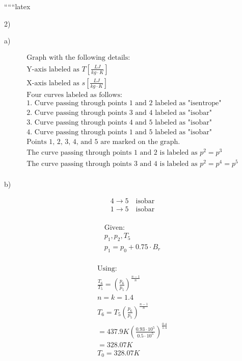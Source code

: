 
``````latex


2)

a)

\[
\begin{array}{c}
\text{Graph with the following details:} \\
\text{Y-axis labeled as } T \left[ \frac{LJ}{kg \cdot K} \right] \\
\text{X-axis labeled as } s \left[ \frac{LJ}{kg \cdot K} \right] \\
\text{Four curves labeled as follows:} \\
\text{1. Curve passing through points 1 and 2 labeled as "isentrope"} \\
\text{2. Curve passing through points 3 and 4 labeled as "isobar"} \\
\text{3. Curve passing through points 4 and 5 labeled as "isobar"} \\
\text{4. Curve passing through points 1 and 5 labeled as "isobar"} \\
\text{Points 1, 2, 3, 4, and 5 are marked on the graph.} \\
\text{The curve passing through points 1 and 2 is labeled as } p^2 = p^3 \\
\text{The curve passing through points 3 and 4 is labeled as } p^2 = p^4 = p^5 \\
\end{array}
\]

b)

\[
\begin{array}{l}
4 \rightarrow 5 \quad \text{isobar} \\
1 \rightarrow 5 \quad \text{isobar} \\
\end{array}
\]

\[
\begin{array}{l}
\text{Given:} \\
p_1, p_2, T_5 \\
p_1 = p_0 + 0.75 \cdot B_r \\
\end{array}
\]

\[
\begin{array}{l}
\text{Using:} \\
\frac{T_6}{T_5} = \left( \frac{p_6}{p_5} \right)^{\frac{n-1}{n}} \\
n = k = 1.4 \\
T_6 = T_5 \left( \frac{p_6}{p_5} \right)^{\frac{n-1}{n}} \\
= 437.9 K \left( \frac{0.93 \cdot 10^5}{0.5 \cdot 10^5} \right)^{\frac{0.4}{1.4}} \\
= 328.07 K \\
T_0 = 328.07 K \\
\end{array}
\]


